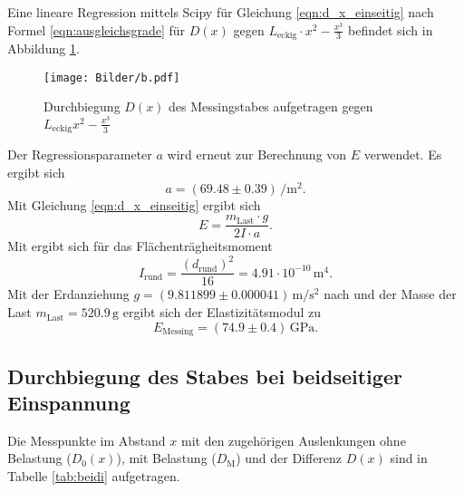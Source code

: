 Eine lineare Regression mittels Scipy \cite{scipy} für Gleichung \eqref{eqn:d_x_einseitig} nach Formel \eqref{eqn:ausgleichsgrade} für $D(x)$ gegen $L_{\mathrm{eckig}}\cdot x^2-\frac{x^3}{3}$
befindet sich in Abbildung \ref{fig:messing_einseitig}.

\begin{figure}
	\centering
	\texttt{[image: Bilder/b.pdf]}
	\caption{Durchbiegung $D(x)$ des Messingstabes aufgetragen gegen $L_{\mathrm{eckig}}x^2-\frac{x^3}{3}$}
	\label{fig:messing_einseitig}
\end{figure}
Der Regressionsparameter $a$ wird erneut zur Berechnung von $E$ verwendet.
Es ergibt sich
\begin{equation*}
	a=(69.48 \pm 0.39) \, \si{\per\square\meter} \text{.}
\end{equation*}
Mit Gleichung \eqref{eqn:d_x_einseitig} ergibt sich
\begin{equation}
	E=\frac{m_{\mathrm{Last}}\cdot g}{2I\cdot a} \text{.}
\end{equation}
Mit \cite{bla} ergibt sich für das Flächenträgheitsmoment
\begin{equation}
	I_{\mathrm{rund}}=\frac{(d_{\mathrm{rund}})^2}{16}= 4.91 \cdot 10^{-10} \,\si{\meter\tothe{4}}	 \text{.}
\end{equation}
Mit der Erdanziehung $g=(9.811899 \pm 0.000041) \,\si{\meter\per\square\second}$ nach \cite{G} und der Masse der Last $m_{\mathrm{Last}}=520.9\,\si{\gram}$ ergibt sich der Elastizitätsmodul zu
\begin{equation*}
	E_{\mathrm{Messing}}= (74.9 \pm 0.4)\,\si{\giga\pascal} \text{.}
\end{equation*}

\FloatBarrier
\subsection{Durchbiegung des Stabes bei beidseitiger Einspannung}

Die Messpunkte im Abstand $x$ mit den zugehörigen Auslenkungen ohne Belastung ($D_0(x)$), mit
Belastung ($D_{\mathrm{M}}$) und der Differenz $D(x)$ sind in Tabelle \ref{tab:beidi}
aufgetragen.


